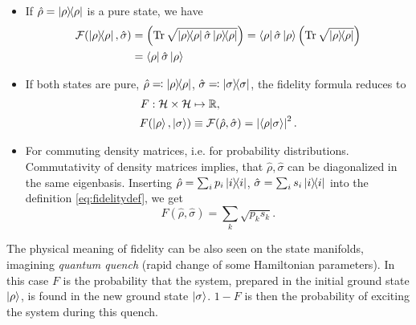 \begin{itemize}
    \item If $\hat\rho=\ket{\rho}\!\!\bra{\rho}$ is a pure state, we have
    \begin{equation}
        \begin{split}
            \mathcal F(\ket{\rho}\!\!\bra{\rho},\hat\sigma) &= \left(\Tr\sqrt{\ket{\rho}\!\!\bra{\rho}\hat\sigma \ket{\rho}\!\!\bra{\rho}} \right) = \bra{\rho}\hat\sigma \ket{\rho} \left(\Tr\sqrt{\ket{\rho}\!\!\bra{\rho}} \right) \\
            &= \bra{\rho}\hat\sigma \ket{\rho}
        \end{split}
    \end{equation}
    
    \item If both states are pure, $\hat\rho\eqqcolon\ket{\rho}\!\!\bra{\rho}$, $\hat\sigma\eqqcolon\ket{\sigma}\!\!\bra{\sigma}$, the fidelity formula reduces to
    \begin{equation}
        \begin{split}    
            F: \mathcal{H}\times\mathcal{H}&\mapsto \mathbb{R}, \\
            F(\ket{\rho},\ket{\sigma}) &\equiv  \mathcal F(\hat\rho,\hat\sigma) = \left| \braket{\rho|\sigma}\right|^2.
        \end{split}
    \end{equation}
    

    \item For commuting density matrices, i.e. for probability distributions. Commutativity of density matrices implies, that $\hat\rho,\hat\sigma$ can be diagonalized in the same eigenbasis. Inserting $\hat\rho = \sum_i p_i \ket{i}\!\!\bra{i}$, $\hat\sigma = \sum_i s_i \ket{i}\!\!\bra{i}$ into the definition \ref{eq:fidelitydef}, we get
    \begin{equation}
        F(\hat\rho,\hat\sigma)=\sum_k\sqrt{p_k s_k}.
    \end{equation} 

\end{itemize}
    
    
The physical meaning of fidelity can be also seen on the state manifolds, imagining \emph{quantum quench} (rapid change of some Hamiltonian parameters). In this case $F$ is the probability that the system, prepared in the initial ground state $\ket{\rho}$, is found in the new ground state $\ket{\sigma}$. $1-F$ is then the probability of exciting the system during this quench.
    





